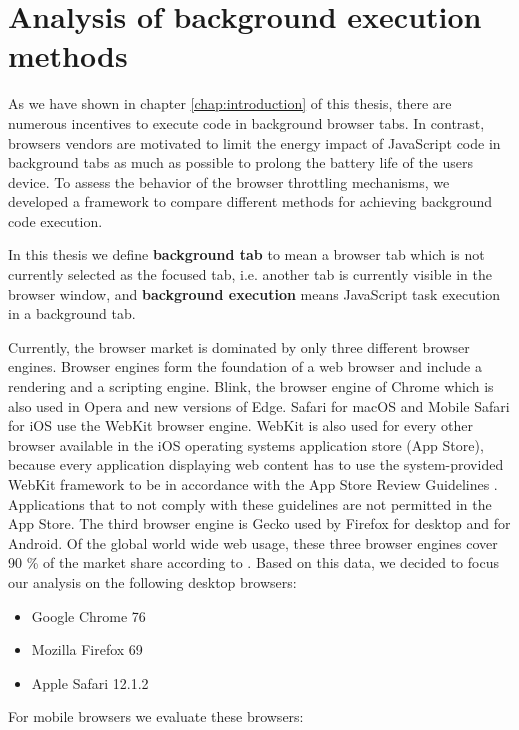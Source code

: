 \documentclass[
	ruledheaders=section,%
	class=report,%
	thesis={type=bachelor},%
	accentcolor=9c,%
	custommargins=true,%
	marginpar=false,%
	parskip=half-,%
	fontsize=11pt,%
]{tudapub}
\begin{document}
  \newpage
  \chapter{Analysis of background execution methods}
  \label{chap:analysis}

  As we have shown in chapter \ref{chap:introduction} of this thesis, there are numerous incentives to execute code in background browser tabs. In contrast, browsers vendors are motivated to limit the energy impact of JavaScript code in background tabs as much as possible to prolong the battery life of the users device. To assess the behavior of the browser throttling mechanisms, we developed a framework to compare different methods for achieving background code execution.

   In this thesis we define \textbf{background tab} to mean a browser tab which is not currently selected as the focused tab, i.e. another tab is currently visible in the browser window, and \textbf{background execution} means JavaScript task execution in a background tab.

  Currently, the browser market is dominated by only three different browser engines. Browser engines form the foundation of a web browser and include a rendering and a scripting engine. Blink, the browser engine of Chrome which is also used in Opera and new versions of Edge. Safari for macOS and Mobile Safari for iOS use the WebKit browser engine. WebKit is also used for every other browser available in the iOS operating systems application store (App Store), because every application displaying web content has to use the system-provided WebKit framework to be in accordance with the App Store Review Guidelines \cite{apple-app-review-guideline}. Applications that to not comply with these guidelines are not permitted in the App Store. The third browser engine is Gecko used by Firefox for desktop and for Android. Of the global world wide web usage, these three browser engines cover 90 \% of the market share according to \cite{statcounter-global-browser-market-share}. Based on this data, we decided to focus our analysis on the following desktop browsers:

  \begin{itemize}
  \item Google Chrome 76
  \item Mozilla Firefox 69
  \item Apple Safari 12.1.2
  \end{itemize}

  For mobile browsers we evaluate these browsers:
\end{document}
